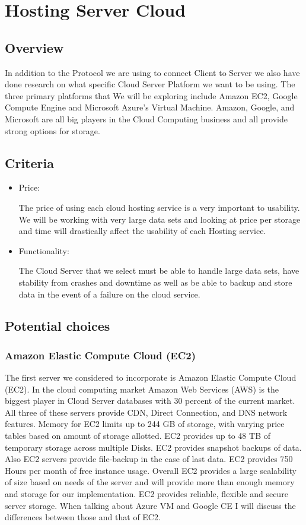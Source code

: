 \section{ Hosting Server Cloud }


\subsection{ Overview }

In addition to the Protocol we are using to connect Client to Server we also have done research on what specific Cloud Server Platform we want to be using. The three primary platforms that We will be exploring include Amazon EC2, Google Compute Engine and Microsoft Azure’s Virtual Machine. Amazon, Google, and Microsoft are all big players in the Cloud Computing business and all provide strong options for storage.
\subsection{ Criteria }

\begin{itemize}
  \item Price:

The price of using each cloud hosting service is a very important to usability. We will be working with very large data sets and looking at price per storage and time will drastically affect the usability of each Hosting service.

  \item Functionality:

 The Cloud Server that we select must be able to handle large data sets, have stability from crashes and downtime as well as be able to backup and store data in the event of a failure on the cloud service.

\end{itemize}

\subsection{ Potential choices }
\subsubsection{ Amazon Elastic Compute Cloud (EC2)}

The first server we considered to incorporate is Amazon Elastic Compute Cloud (EC2). In the cloud computing market Amazon Web Services (AWS) is the biggest player in Cloud Server databases with 30 percent of the current market. All three of these servers provide CDN, Direct Connection, and DNS network features. Memory for EC2 limits up to 244 GB of storage, with varying price tables based on amount of storage allotted. EC2 provides up to 48 TB of temporary storage across multiple Disks. EC2 provides snapshot backups of data. Also EC2 servers provide file-backup in the case of last data. EC2 provides 750 Hours per month of free instance usage. Overall  EC2 provides a large scalability of size based on needs of the server and will provide more than enough memory and storage for our implementation. EC2 provides reliable, flexible and secure server storage. When talking about Azure VM and Google CE I will discuss the differences between those and that of EC2.
